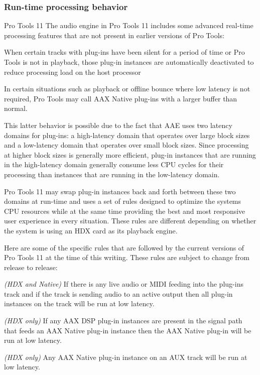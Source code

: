 \hypertarget{a00360_subsection__runtime_processing_behavior}{}\subsubsection{Run-\/time processing behavior}\label{a00360_subsection__runtime_processing_behavior}
  Pro Tools 11 The audio engine in Pro Tools 11 includes some advanced real-\/time processing features that are not present in earlier versions of Pro Tools\+:


\begin{DoxyItemize}
\item When certain tracks with plug-\/ins have been silent for a period of time or Pro Tools is not in playback, those plug-\/in instances are automatically deactivated to reduce processing load on the host processor  
\item In certain situations such as playback or offline bounce where low latency is not required, Pro Tools may call A\+A\+X Native plug-\/ins with a larger buffer than normal. 
\end{DoxyItemize}

This latter behavior is possible due to the fact that A\+A\+E uses two latency domains for plug-\/ins\+: a high-\/latency domain that operates over large block sizes and a low-\/latency domain that operates over small block sizes. Since processing at higher block sizes is generally more efficient, plug-\/in instances that are running in the high-\/latency domain generally consume less C\+P\+U cycles for their processing than instances that are running in the low-\/latency domain.

Pro Tools 11 may swap plug-\/in instances back and forth between these two domains at run-\/time and uses a set of rules designed to optimize the system\textquotesingle{}s C\+P\+U resources while at the same time providing the best and most responsive user experience in every situation. These rules are different depending on whether the system is using an H\+D\+X card as its playback engine.

Here are some of the specific rules that are followed by the current versions of Pro Tools 11 at the time of this writing. These rules are subject to change from release to release\+:


\begin{DoxyItemize}
\item {\itshape (H\+D\+X and Native)} If there is any live audio or M\+I\+D\+I feeding into the plug-\/in\textquotesingle{}s track and if the track is sending audio to an active output then all plug-\/in instances on the track will be run at low latency. 
\item {\itshape (H\+D\+X only)} If any A\+A\+X D\+S\+P plug-\/in instances are present in the signal path that feeds an A\+A\+X Native plug-\/in instance then the A\+A\+X Native plug-\/in will be run at low latency. 
\item {\itshape (H\+D\+X only)} Any A\+A\+X Native plug-\/in instance on an A\+U\+X track will be run at low latency. 
\end{DoxyItemize}

